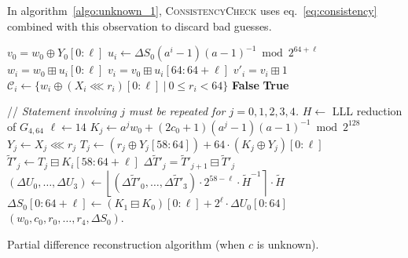 \documentclass[submission,svgnames,journal=tosc]{iacrtrans}
\begin{document}
In algorithm~\ref{algo:unknown_1}, \textsc{ConsistencyCheck} uses
eq.~\eqref{eq:consistency} combined with this observation to discard bad guesses.



\begin{algorithm}
\begin{algorithmic}[1]
  \State $v_0 = w_0 \oplus Y_0[0:\ell]$ 
  \State $u_i \gets \Delta S_0 (a^i-1)(a-1)^{-1} \bmod 2^{64+\ell}$ 
  \State $w_i = w_0 \boxplus u_i[0:\ell]$ 
  \State $v_i = v_0 \boxplus u_i[64:64+\ell]$ 
  \State $v'_i = v_i \boxplus 1$
  \State $\mathcal{C}_i \gets \{ w_i \oplus (X_i \lll r_i)[0:\ell]~|~ 0\leq r_i < 64\}$ 
  \State \Return \textbf{False} 
  \EndIf
  \EndFor
  \State \Return \textbf{True} 
  \EndProcedure

\State 
  
  \State // \emph{Statement involving $j$ must be repeated for $j=0, 1, 2, 3, 4$.}
  \State $H \gets$ LLL reduction of $G_{4,64}$
  \State $\ell \gets 14$
 
\State $K_j \gets a^j w_0 + (2c_0 + 1)(a^j - 1)(a-1)^{-1} \bmod 2^{128}$ 
   
  \State $Y_j \gets X_j \lll r_j$ 
  \State $T_j \gets \left(r_j \oplus Y_j[58:64]\right) +  64 \cdot \left(K_j \oplus Y_j\right)[0:\ell]$ 
  \State $\widetilde{T}'_j \gets T_j \boxminus  K_i[58:64+\ell]$ 
  \State $\Delta \widetilde{T}'_j = \widetilde{T}'_{j+1} \boxminus \widetilde{T}'_j$  
  \State $(\Delta U_0, \dots, \Delta U_3) \gets \left\lfloor (\Delta \widetilde{T}'_0, \dots, \Delta \widetilde{T}'_3) \cdot 2^{58-\ell} \cdot \widetilde H^{-1} \right\rceil \cdot \widetilde H$ 
  \State $\Delta S_0[0:64+\ell] \gets \left(K_1 \boxminus K_0\right)[0:\ell]
  + 2^{\ell} \cdot \Delta U_0[0:64]$ 
  \State \Return $(w_0, c_0, r_0, \dots, r_4, \Delta S_0)$.
  \EndIf
  \EndFor
  \EndFor
  \EndProcedure
\end{algorithmic}
\caption{Partial difference reconstruction algorithm (when $c$ is unknown).}
\label{algo:unknown_1}
\end{algorithm}
\end{document}
